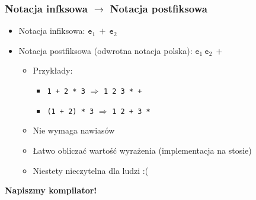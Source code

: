 \documentclass{beamer}
\begin{document}
	\begin{frame}
		\frametitle{Notacja infksowa $\rightarrow$ Notacja postfiksowa}
		\begin{itemize}
			\item Notacja infiksowa: $\texttt{e}_1\ +\ \texttt{e}_2$
			\item Notacja postfiksowa (odwrotna notacja polska): $\texttt{e}_1\ \texttt{e}_2\ +$
			\begin{itemize}
				\item Przykłady:
				\begin{itemize}
					\item \texttt{1 + 2 * 3}\hspace{1em} $\Rightarrow$ \hspace{1em}\texttt{1 2 3 * +}
					\item \texttt{(1 + 2) * 3}\hspace{1em} $\Rightarrow$ \hspace{1em}\texttt{1 2 + 3 * }
				\end{itemize}
				\item Nie wymaga nawiasów
				\item Łatwo obliczać wartość wyrażenia (implementacja na stosie)
				\item Niestety nieczytelna dla ludzi :( 
			\end{itemize}
		\end{itemize}
	\pause
	\textbf{Napiszmy kompilator!}\newline
	\end{frame}
	
\end{document}
